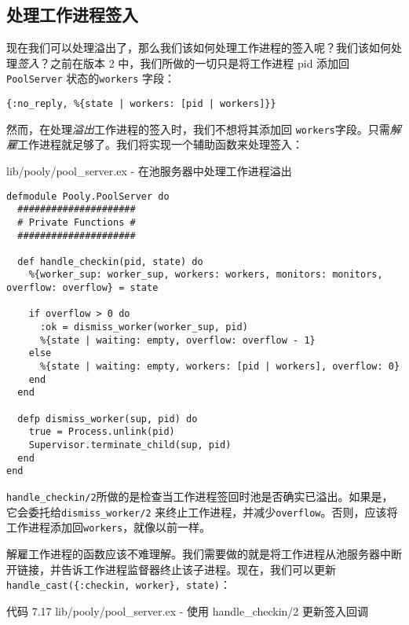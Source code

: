 \subsection{处理工作进程签入}

现在我们可以处理溢出了，那么我们该如何处理工作进程的签入呢？我们该如何处理\emph{签入}？之前在版本
2 中，我们所做的一切只是将工作进程 pid 添加回\texttt{PoolServer} 状态的\texttt{workers} 字段：

\begin{code}{}
  \begin{verbatim}
{:no_reply, %{state | workers: [pid | workers]}}
\end{verbatim}
\end{code}

然而，在处理\emph{溢出}工作进程的签入时，我们不想将其添加回
\texttt{workers}字段。只需\emph{解雇}工作进程就足够了。我们将实现一个辅助函数来处理签入：

\begin{code}{lib/pooly/pool\_server.ex - 在池服务器中处理工作进程溢出}
\begin{verbatim}
defmodule Pooly.PoolServer do
  #####################
  # Private Functions #
  #####################

  def handle_checkin(pid, state) do
    %{worker_sup: worker_sup, workers: workers, monitors: monitors, overflow: overflow} = state

    if overflow > 0 do
      :ok = dismiss_worker(worker_sup, pid)
      %{state | waiting: empty, overflow: overflow - 1}
    else
      %{state | waiting: empty, workers: [pid | workers], overflow: 0}
    end
  end

  defp dismiss_worker(sup, pid) do
    true = Process.unlink(pid)
    Supervisor.terminate_child(sup, pid)
  end
end
\end{verbatim}
\label{lst:server-ex_pooly}
\end{code}

\texttt{handle\_checkin/2}所做的是检查当工作进程签回时池是否确实已溢出。如果是，它会委托给\texttt{dismiss\_worker/2} 来终止工作进程，并减少\texttt{overflow}。否则，应该将工作进程添加回\texttt{workers}，就像以前一样。

解雇工作进程的函数应该不难理解。我们需要做的就是将工作进程从池服务器中断开链接，并告诉工作进程监督器终止该子进程。现在，我们可以更新
\texttt{handle\_cast(\{:checkin, worker\}, state)}：

代码 7.17 lib/pooly/pool\_server.ex - 使用 handle\_checkin/2
更新签入回调

